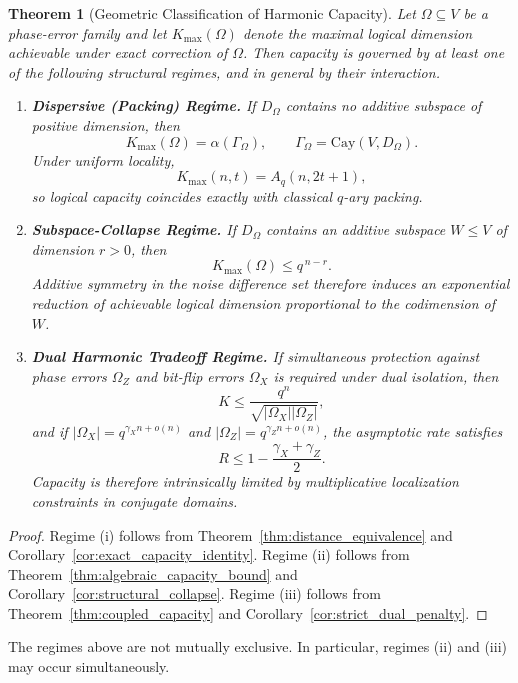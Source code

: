 \documentclass[a4paper,twocolumn,11pt,allowtoday]{quantumarticle}
\theoremstyle{plain}
\newtheorem{theorem}{Theorem}[section]
\theoremstyle{definition}
\theoremstyle{remark}
\begin{document}
\begin{theorem}[Geometric Classification of Harmonic Capacity]
\label{thm:geometric_classification}
Let $\Omega \subseteq V$ be a phase-error family and let $K_{\max}(\Omega)$ denote the maximal logical dimension achievable under exact correction of $\Omega$. Then capacity is governed by at least one of the following structural regimes, and in general by their interaction.
\begin{enumerate}
\item[(i)] \textbf{Dispersive (Packing) Regime.}
If $D_\Omega$ contains no additive subspace of positive dimension, then
\[
K_{\max}(\Omega)=\alpha(\Gamma_\Omega), 
\qquad 
\Gamma_\Omega=\mathrm{Cay}(V,D_\Omega).
\]
Under uniform locality,
\[
K_{\max}(n,t)=A_q(n,2t+1),
\]
so logical capacity coincides exactly with classical $q$-ary packing.

\item[(ii)] \textbf{Subspace-Collapse Regime.}
If $D_\Omega$ contains an additive subspace $W\le V$ of dimension $r>0$, then
\[
K_{\max}(\Omega)\le q^{\,n-r}.
\]
Additive symmetry in the noise difference set therefore induces an exponential reduction of achievable logical dimension proportional to the codimension of $W$.

\item[(iii)] \textbf{Dual Harmonic Tradeoff Regime.}
If simultaneous protection against phase errors $\Omega_Z$ and bit-flip errors $\Omega_X$ is required under dual isolation, then
\[
K \le \frac{q^n}{\sqrt{|\Omega_X||\Omega_Z|}},
\]
and if $|\Omega_X| = q^{\gamma_X n + o(n)}$ and $|\Omega_Z| = q^{\gamma_Z n + o(n)}$, the asymptotic rate satisfies
\[
R \le 1 - \frac{\gamma_X+\gamma_Z}{2}.
\]
Capacity is therefore intrinsically limited by multiplicative localization constraints in conjugate domains.
\end{enumerate}
\end{theorem}

\begin{proof}
Regime (i) follows from Theorem~\ref{thm:distance_equivalence} and Corollary~\ref{cor:exact_capacity_identity}. Regime (ii) follows from Theorem~\ref{thm:algebraic_capacity_bound} and Corollary~\ref{cor:structural_collapse}. Regime (iii) follows from Theorem~\ref{thm:coupled_capacity} and Corollary~\ref{cor:strict_dual_penalty}.
\end{proof}

\noindent
The regimes above are not mutually exclusive. In particular, regimes (ii) and (iii) may occur simultaneously.
\end{document}
